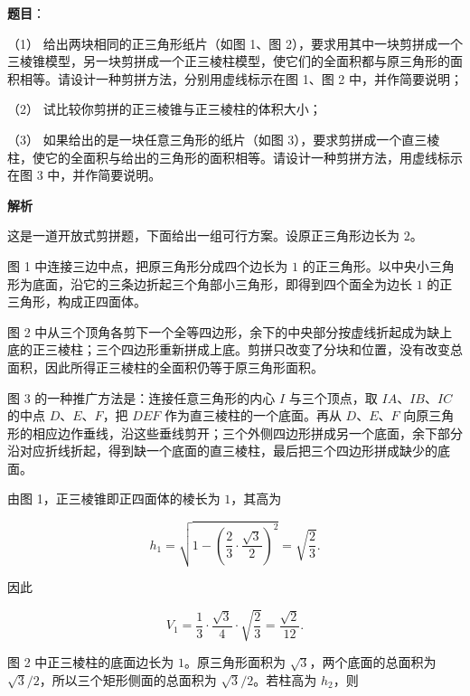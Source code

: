 \begin{answer}

\textbf{题目}：

（1） 给出两块相同的正三角形纸片（如图 1、图 2），要求用其中一块剪拼成一个三棱锥模型，另一块剪拼成一个正三棱柱模型，使它们的全面积都与原三角形的面积相等。请设计一种剪拼方法，分别用虚线标示在图 1、图 2 中，并作简要说明；

（2） 试比较你剪拼的正三棱锥与正三棱柱的体积大小；

（3） 如果给出的是一块任意三角形的纸片（如图 3），要求剪拼成一个直三棱柱，使它的全面积与给出的三角形的面积相等。请设计一种剪拼方法，用虚线标示在图 3 中，并作简要说明。
\nopagebreak[4]
\begin{center}\end{center}
\nopagebreak[4]
\textbf{解析}

这是一道开放式剪拼题，下面给出一组可行方案。设原正三角形边长为 $2$。


图 1 中连接三边中点，把原三角形分成四个边长为 $1$ 的正三角形。以中央小三角形为底面，沿它的三条边折起三个角部小三角形，即得到四个面全为边长 $1$ 的正三角形，构成正四面体。

图 2 中从三个顶角各剪下一个全等四边形，余下的中央部分按虚线折起成为缺上底的正三棱柱；三个四边形重新拼成上底。剪拼只改变了分块和位置，没有改变总面积，因此所得正三棱柱的全面积仍等于原三角形面积。


图 3 的一种推广方法是：连接任意三角形的内心 $I$ 与三个顶点，取 $IA\text{、}IB\text{、}IC$ 的中点 $D\text{、}E\text{、}F$，把 $DEF$ 作为直三棱柱的一个底面。再从 $D\text{、}E\text{、}F$ 向原三角形的相应边作垂线，沿这些垂线剪开；三个外侧四边形拼成另一个底面，余下部分沿对应折线折起，得到缺一个底面的直三棱柱，最后把三个四边形拼成缺少的底面。


由图 1，正三棱锥即正四面体的棱长为 $1$，其高为

\nopagebreak[4]
\[
h_1=\sqrt{1-\left(\frac{2}{3}\cdot\frac{\sqrt3}{2}\right)^2}
=\sqrt{\frac23}.
\]

因此

\nopagebreak[4]
\[
V_1=\frac13\cdot\frac{\sqrt3}{4}\cdot\sqrt{\frac23}
=\frac{\sqrt2}{12}.
\]

图 2 中正三棱柱的底面边长为 $1$。原三角形面积为 $\sqrt3$，两个底面的总面积为 $\sqrt3/2$，所以三个矩形侧面的总面积为 $\sqrt3/2$。若柱高为 $h_2$，则


\end{answer}
